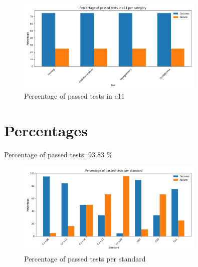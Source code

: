 \documentclass{article}
\begin{document}
\newpage
\begin{figure}[h!]
\centering
\includegraphics[width=0.8\textwidth]{../reports/clava/images/c11_percentage.png}
\caption{Percentage of passed tests in c11}
\label{fig:c11_percentage}
\end{figure}
\newpage
\section{Percentages}Percentage of passed tests:
93.83 \%\begin{figure}[h!]
\centering
\includegraphics[width=0.8\textwidth]{../reports/clava/images/global_percentage.png}
\caption{Percentage of passed tests per standard}
\label{fig:global_percentage}
\end{figure}
\end{document}
